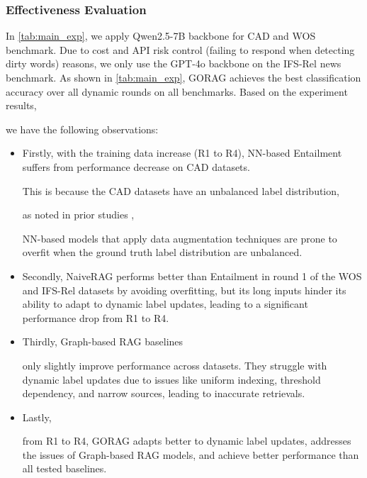 \subsubsection{\textbf{Effectiveness Evaluation}}\label{sec:effectiveness}
	In \autoref{tab:main_exp}, we apply Qwen2.5-7B backbone for CAD and WOS benchmark. 
	Due to cost and API risk control (failing to respond when detecting dirty words) reasons, we only use the GPT-4o backbone on the IFS-Rel news benchmark. 
As shown in \autoref{tab:main_exp}, GORAG achieves the best classification accuracy over all dynamic rounds on all benchmarks. 
Based on the experiment results, 






we have the following observations: 

\begin{itemize}[leftmargin=*]
\item Firstly, with the training data increase (R1 to R4), NN-based Entailment suffers from performance decrease on CAD datasets.

This is because the CAD datasets have an unbalanced label distribution, 


as noted in prior studies \cite{liu2023pre,liu2024liberating,lei2023tart}, 





NN-based models that apply data augmentation techniques are prone to overfit when the ground truth label distribution are unbalanced.






\item Secondly,
NaiveRAG performs better than Entailment in round 1 of the WOS and IFS-Rel datasets by avoiding overfitting, but its long inputs hinder its ability to adapt to dynamic label updates, leading to a significant performance drop from R1 to R4. 










\item Thirdly, 
Graph-based RAG baselines 

only slightly improve performance across datasets. They struggle with dynamic label updates due to issues like uniform indexing, threshold dependency, and narrow sources, leading to inaccurate retrievals. 





\item Lastly, 

from R1 to R4, GORAG adapts better to dynamic label updates, addresses the issues of Graph-based RAG models, and achieve better performance than all tested baselines. 

\end{itemize}

